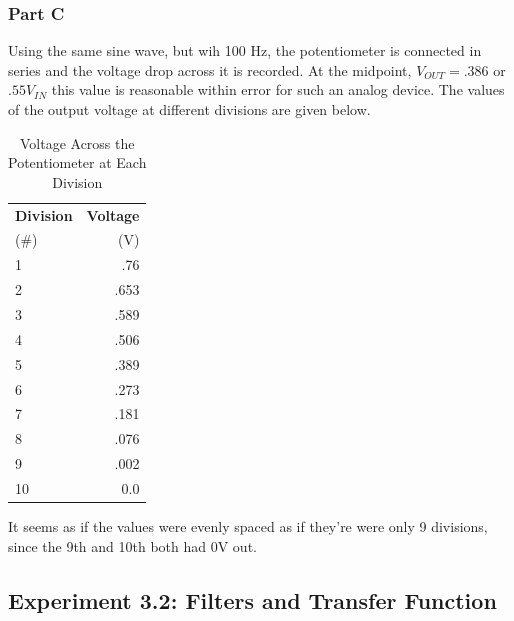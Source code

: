 \documentclass[10pt]{article}
\begin{document}
\subsubsection{Part C} 
	Using the same sine wave, but wih 100 Hz, the potentiometer is connected in series and the voltage drop across it is recorded. At the midpoint, $V_{OUT} = .386$ or $.55 V_{IN}$ this value is reasonable within error for such an analog device. 
	The values of the output voltage at different divisions are given below.
\begin{table}[H]
	\begin{center}
		\caption{Voltage Across the Potentiometer at Each Division}
		\label{tab: 31C}
		\begin{tabular}{l|r}
			\textbf{Division} & \textbf{Voltage}\\
			(\#) & (V)\\
			\hline
			1 & .76\\
			2 & .653\\
			3 & .589\\
			4 & .506\\
			5 & .389\\
			6 & .273\\
			7 & .181\\
			8 & .076\\
			9 & .002\\
			10 & 0.0\\
		\end{tabular}
	\end{center}
\end{table}
 	It seems as if the values were evenly spaced as if they're were only 9 divisions, since the 9th and 10th both had 0V out.
\subsection{Experiment 3.2: Filters and Transfer Function}
\end{document}
